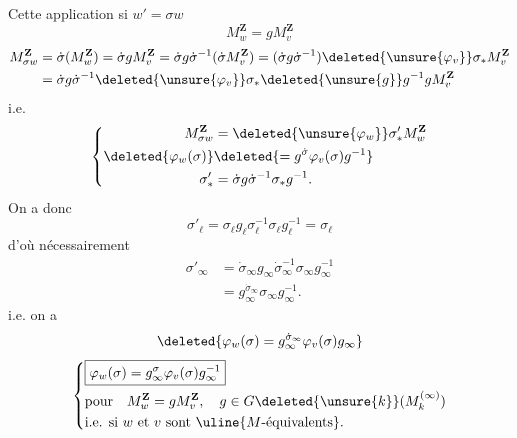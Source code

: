 Cette application   si $w'=\sigma w$
\[
M_w^{\mathbf Z}=gM_v^{\mathbf Z}
\]
\[
\begin{aligned}
M_{\sigma w}^{\mathbf Z}&=\dot\sigma(M_w^{\mathbf Z})=\dot\sigma gM_v^{\mathbf Z}
=\dot\sigma g\dot\sigma^{-1}(\dot\sigma M_v^{\mathbf Z})
=(\dot\sigma g\dot\sigma^{-1})\deleted{\unsure{\varphi_v}}\sigma_*M_v^{\mathbf Z}\\
&=\dot\sigma g\dot\sigma^{-1}\deleted{\unsure{\varphi_v}}\sigma_*\deleted{\unsure{g}}g^{-1}gM_v^{\mathbf Z}
\end{aligned}
\]
i.e.
\[
\left\{\begin{aligned}
M_{\sigma w}^{\mathbf Z}&=\deleted{\unsure{\varphi_w}}\sigma'_*M_w^{\mathbf Z}\\
\deleted{\varphi_w(\sigma)}&\deleted{=g^{\dot\sigma}\varphi_v(\sigma)g^{-1}}\\
\sigma'_*&=\dot\sigma g\dot\sigma^{-1}\sigma_*g^{-1}.
\end{aligned}\right.
\]
On a donc 
\[
\sigma'_\ell=\sigma_\ell g_\ell\sigma_\ell^{-1}\sigma_\ell g_\ell^{-1}=\sigma_\ell
\]
d'où nécessairement
\[
\begin{aligned}
\sigma'_\infty&=\dot\sigma_\infty g_\infty\dot\sigma_\infty^{-1}\sigma_\infty g_\infty^{-1}\\
&=g_\infty^{\dot\sigma_\infty}\sigma_\infty g_\infty^{-1}.
\end{aligned}
\]
i.e. on a
\[
\deleted{\varphi_w(\sigma)=g_\infty^{\dot\sigma_\infty}\varphi_v(\sigma)g_\infty}
\]
\[
\left\{\begin{aligned}
&\boxed{\varphi_w(\sigma)=g_\infty^\sigma\varphi_v(\sigma)g_\infty^{-1}}\\
&\text{pour}\quad M_w^{\mathbf Z}=gM_v^{\mathbf Z},\quad g\in G\deleted{\unsure{k}}(M_k^{(\infty)})\\
&\text{i.e. si }w\text{ et }v\text{ sont }\uline{M\text{-équivalents}}.
\end{aligned}\right.
\]

